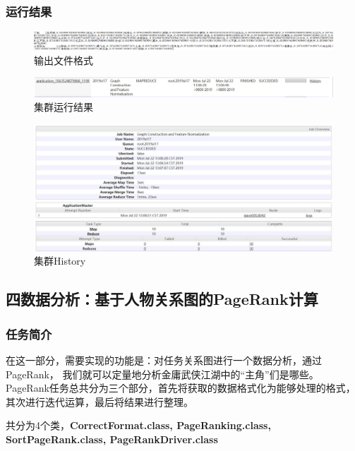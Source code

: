 \documentclass{ctexart}
\begin{document}
	\subsubsection{运行结果}
	\begin{figure}[H]
		\centering
		\includegraphics[width=0.8\linewidth,height=0.1\linewidth]{pic/task3/result}
		\caption{输出文件格式}
	\end{figure}
	\begin{figure}[H]
	\centering
	\includegraphics[width=0.8\linewidth]{pic/webui/task3}
	\caption{集群运行结果}
	\end{figure}
	\begin{figure}[H]
	\centering
	\includegraphics[width=0.8\linewidth]{pic/webui/task3_job}
	\caption{集群History}
	\end{figure}

	\subsection{四\quad 数据分析：基于人物关系图的PageRank计算}
	\subsubsection{任务简介}
	\par 在这一部分，需要实现的功能是：对任务关系图进行一个数据分析，通过PageRank，
	我们就可以定量地分析金庸武侠江湖中的“主角”们是哪些。PageRank任务总共分为三个部分，首先将获取的数据格式化为能够处理的格式，其次进行迭代运算，最后将结果进行整理。
	\par 共分为4个类，\textbf{CorrectFormat.class, PageRanking.class, SortPageRank.class, PageRankDriver.class}
\end{document}
